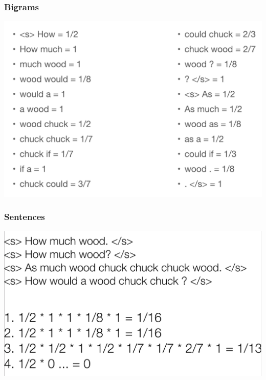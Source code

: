 \documentclass{beamer}
\begin{document}
\begin{frame}
\frametitle{Bigrams}
\includegraphics[width=\textwidth]{figures/woodchuck1}
\end{frame}

\begin{frame}
\frametitle{Sentences}
\includegraphics[width=\textwidth]{figures/woodchuck2}
\end{frame}
\end{document}

